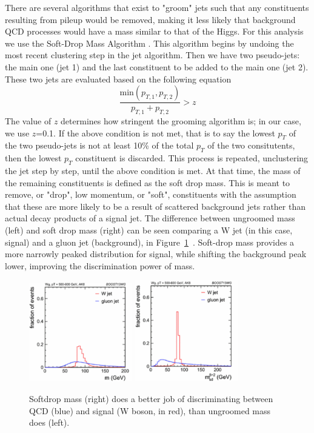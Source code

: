 There are several algorithms that exist to "groom" jets such that any constituents resulting from pileup would be removed, making it less likely that background QCD processes would have a mass similar to that of the Higgs. For this analysis we use the Soft-Drop Mass Algorithm \cite{Larkoski:2014wba}. This algorithm begins by undoing the most recent clustering step in the jet algorithm. Then we have two pseudo-jets: the main one (jet 1) and the last constituent to be added to the main one (jet 2). These two jets are evaluated based on the following equation
\begin{equation}
   \frac{\textrm{min}(p_{T,1},p_{T,2})}{p_{T,1} + p_{T,2}} > z
\end{equation}
The value of $z$ determines how stringent the grooming algorithm is; in our case, we use $z$=0.1. If the above condition is not met, that is to say the lowest $p_{T}$ of the two pseudo-jets is not at least 10\% of the total $p_{T}$ of the two consitutents, then the lowest $p_{T}$ constituent is discarded. This process is repeated, unclustering the jet step by step, until the above condition is met. At that time, the mass of the remaining constituents is defined as the soft drop mass. This is meant to remove, or "drop", low momentum, or "soft", constituents with the assumption that these are more likely to be a result of scattered background jets rather than actual decay products of a signal jet. The difference between ungroomed mass (left) and soft drop mass (right) can be seen comparing a W jet (in this case, signal) and a gluon jet (background), in Figure~\ref{Fig:Tag:SD}~\cite{Adams:2015hiv}. Soft-drop mass provides a more narrowly peaked distribution for signal, while shifting the background peak lower, improving the discrimination power of mass.
\begin{figure}[h!]
    \centering
        \includegraphics[width=0.4\textwidth]{F4/ungroomed.PNG}
        \includegraphics[width=0.4\textwidth]{F4/sd.PNG}
        \caption{Softdrop mass (right) does a better job of discriminating between QCD (blue) and signal (W boson, in red), than ungroomed mass does (left).}
        \label{Fig:Tag:SD}
\end{figure}

